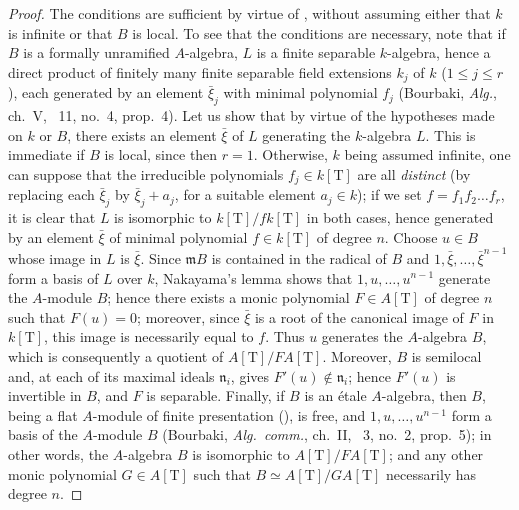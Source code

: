 \begin{proof}
The conditions are sufficient by virtue of , without assuming either that $k$ is infinite or that $B$ is local.
To see that the conditions are necessary, note that if $B$ is a formally unramified $A$-algebra, $L$ is a finite separable $k$-algebra, hence a direct product of finitely many finite separable field extensions $k_j$ of $k$ ($1\leq j\leq r$), each generated by an element $\bar{\xi}_j$ with minimal polynomial $f_j$ (Bourbaki, \emph{Alg.}, ch.~V, \textsection~11, no.~4, prop.~4).
Let us show that by virtue of the hypotheses made on $k$ or $B$, there exists an element $\bar{\xi}$ of $L$ generating the $k$-algebra $L$.
This is immediate if $B$ is local, since then $r=1$.
Otherwise, $k$ being assumed infinite, one can suppose that the irreducible polynomials $f_j\in k[\mathrm{T}]$ are all \emph{distinct} (by replacing each $\bar{\xi}_j$ by $\bar{\xi}_j+a_j$, for a suitable element $a_j\in k$);
if we set $f=f_1 f_2\ldots f_r$, it is clear that $L$ is isomorphic to $k[\mathrm{T}]/f k[\mathrm{T}]$ in both cases, hence generated by an element $\bar{\xi}$ of minimal polynomial $f\in k[\mathrm{T}]$ of degree $n$.
Choose $u\in B$ whose image in $L$ is $\bar{\xi}$.
Since $\mathfrak{m}B$ is contained in the radical of $B$ and $1,\bar{\xi},\ldots,\bar{\xi}^{n-1}$ form a basis of $L$ over $k$, Nakayama's lemma shows that $1,u,\ldots,u^{n-1}$ generate the $A$-module $B$; hence there exists a monic polynomial $F\in A[\mathrm{T}]$ of degree $n$ such that $F(u)=0$;
moreover, since $\bar{\xi}$ is a root of the canonical image of $F$ in $k[\mathrm{T}]$, this image is necessarily equal to $f$.
Thus $u$ generates the $A$-algebra $B$, which is consequently a quotient of $A[\mathrm{T}]/F A[\mathrm{T}]$.
Moreover, $B$ is semilocal and, at each of its maximal ideals $\mathfrak{n}_i$,  gives $F'(u)\notin\mathfrak{n}_i$; hence $F'(u)$ is invertible in $B$, and $F$ is separable.
Finally, if $B$ is an \'etale $A$-algebra, then $B$, being a flat $A$-module of finite presentation (), is free, and $1,u,\ldots,u^{n-1}$ form a basis of the $A$-module $B$ (Bourbaki, \emph{Alg.\ comm.}, ch.~II, \textsection~3, no.~2, prop.~5); in other words,
the $A$-algebra $B$ is isomorphic to $A[\mathrm{T}]/F A[\mathrm{T}]$; and any other monic polynomial $G\in A[\mathrm{T}]$ such that $B\simeq A[\mathrm{T}]/G A[\mathrm{T}]$ necessarily has degree $n$.
\end{proof}

